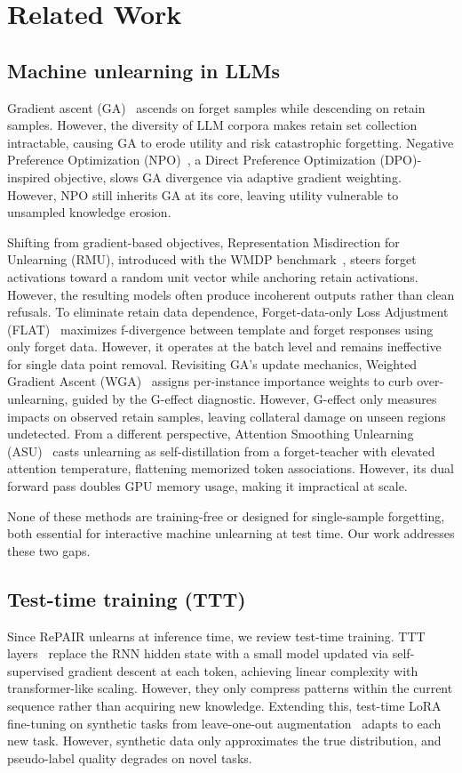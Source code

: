 \section{Related Work}
\label{sec:related}
\subsection{Machine unlearning in LLMs}
Gradient ascent (GA)~\cite{yao2024large} ascends on forget samples while descending on retain samples. However, the diversity of LLM corpora makes retain set collection intractable, causing GA to erode utility and risk catastrophic forgetting. Negative Preference Optimization (NPO)~\cite{zhang2024negative}, a Direct Preference Optimization (DPO)-inspired objective, slows GA divergence via adaptive gradient weighting. However, NPO still inherits GA at its core, leaving utility vulnerable to unsampled knowledge erosion.

Shifting from gradient-based objectives, Representation Misdirection for Unlearning (RMU), introduced with the WMDP benchmark~\cite{li2024wmdp}, steers forget activations toward a random unit vector while anchoring retain activations. However, the resulting models often produce incoherent outputs rather than clean refusals. To eliminate retain data dependence, Forget-data-only Loss Adjustment (FLAT)~\cite{wang2024llm} maximizes f-divergence between template and forget responses using only forget data. However, it operates at the batch level and remains ineffective for single data point removal. Revisiting GA's update mechanics, Weighted Gradient Ascent (WGA)~\cite{wang2025rethinking} assigns per-instance importance weights to curb over-unlearning, guided by the G-effect diagnostic. However, G-effect only measures impacts on observed retain samples, leaving collateral damage on unseen regions undetected. From a different perspective, Attention Smoothing Unlearning (ASU)~\cite{zade2026attention} casts unlearning as self-distillation from a forget-teacher with elevated attention temperature, flattening memorized token associations. However, its dual forward pass doubles GPU memory usage, making it impractical at scale.

None of these methods are training-free or designed for single-sample forgetting, both essential for interactive machine unlearning at test time. Our work addresses these two gaps.

\subsection{Test-time training (TTT)}
Since RePAIR unlearns at inference time, we review test-time training. TTT layers~\cite{sun2024learning} replace the RNN hidden state with a small model updated via self-supervised gradient descent at each token, achieving linear complexity with transformer-like scaling. However, they only compress patterns within the current sequence rather than acquiring new knowledge. Extending this, test-time LoRA fine-tuning on synthetic tasks from leave-one-out augmentation~\cite{akyurek2024surprising} adapts to each new task. However, synthetic data only approximates the true distribution, and pseudo-label quality degrades on novel tasks.

